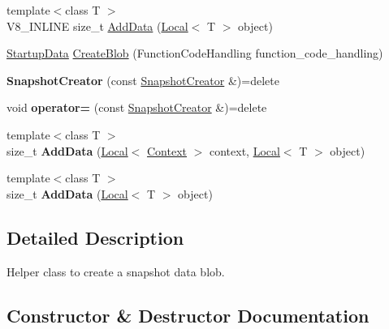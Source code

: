 \begin{DoxyCompactItemize}
\item 
{\footnotesize template$<$class T $>$ }\\V8\+\_\+\+I\+N\+L\+I\+NE size\+\_\+t \mbox{\hyperlink{classv8_1_1SnapshotCreator_a14522fba865a20f502805bc54104bee7}{Add\+Data}} (\mbox{\hyperlink{classv8_1_1Local}{Local}}$<$ T $>$ object)
\item 
\mbox{\hyperlink{classv8_1_1StartupData}{Startup\+Data}} \mbox{\hyperlink{classv8_1_1SnapshotCreator_a86b2023acdb88a9bd6eae2695f2b0a8a}{Create\+Blob}} (Function\+Code\+Handling function\+\_\+code\+\_\+handling)
\item 
\mbox{\label{classv8_1_1SnapshotCreator_a2ecd3018fb28bae605b6dd26cc21ec44}} 
{\bfseries Snapshot\+Creator} (const \mbox{\hyperlink{classv8_1_1SnapshotCreator}{Snapshot\+Creator}} \&)=delete
\item 
\mbox{\label{classv8_1_1SnapshotCreator_ad764835d6388b3442b75016257b9a6df}} 
void {\bfseries operator=} (const \mbox{\hyperlink{classv8_1_1SnapshotCreator}{Snapshot\+Creator}} \&)=delete
\item 
\mbox{\label{classv8_1_1SnapshotCreator_a0bc97ea7ead4892f2dfa64fef20454d9}} 
{\footnotesize template$<$class T $>$ }\\size\+\_\+t {\bfseries Add\+Data} (\mbox{\hyperlink{classv8_1_1Local}{Local}}$<$ \mbox{\hyperlink{classv8_1_1Context}{Context}} $>$ context, \mbox{\hyperlink{classv8_1_1Local}{Local}}$<$ T $>$ object)
\item 
\mbox{\label{classv8_1_1SnapshotCreator_aa8f73b9c58c3851ddf43f3a1b53d4af8}} 
{\footnotesize template$<$class T $>$ }\\size\+\_\+t {\bfseries Add\+Data} (\mbox{\hyperlink{classv8_1_1Local}{Local}}$<$ T $>$ object)
\end{DoxyCompactItemize}


\subsection{Detailed Description}
Helper class to create a snapshot data blob. 

\subsection{Constructor \& Destructor Documentation}
\mbox{\label{classv8_1_1SnapshotCreator_a561a072e2d0656946b8b976fa2769dea}} 
